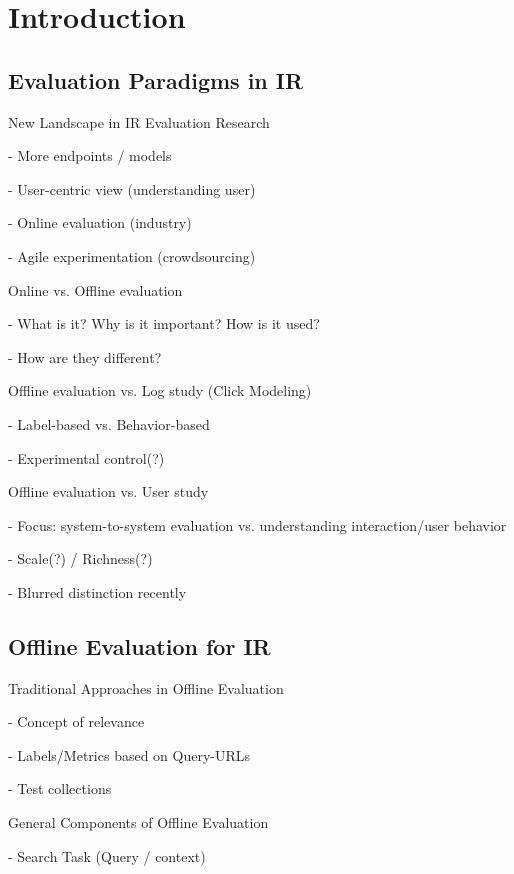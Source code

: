 \documentclass[openany]{now} %
\newcommand{\newpar}{\bigskip\noindent}
\begin{document}
\chapter{Introduction}
\label{c-intro}

\section{Evaluation Paradigms in IR}

New Landscape in IR Evaluation Research

- More endpoints / models

- User-centric view (understanding user)

- Online evaluation (industry)

- Agile experimentation (crowdsourcing)

\newpar
Online \cite{INR-XYZ} vs. Offline evaluation \cite{INR-009} 

- What is it? Why is it important? How is it used?

- How are they different?


\newpar
Offline evaluation vs. Log study (Click Modeling) \cite{chuklin2015click}

- Label-based vs. Behavior-based

- Experimental control(?)

\newpar
Offline evaluation vs. User study \cite{kelly2009methods}

- Focus: system-to-system evaluation vs. understanding interaction/user behavior

- Scale(?) / Richness(?)

- Blurred distinction recently
\cite{Bron:2013}
\cite{Liu:2014}
\cite{Shah:2011}


\section{Offline Evaluation for IR}

Traditional Approaches in Offline Evaluation

- Concept of relevance 

- Labels/Metrics based on Query-URLs

- Test collections 

\cite{borlund2003} \cite{cleverdon67} \cite{voor:trec05}

\newpar
General Components of Offline Evaluation

-	Search Task (Query / context)
\end{document}
